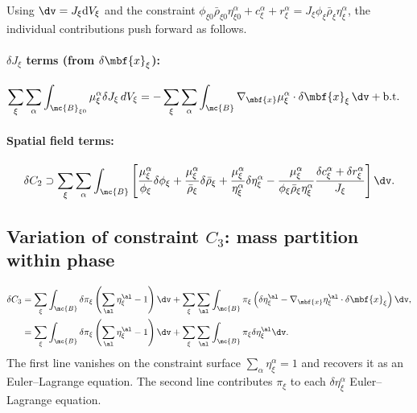 Using $\dv = J_\xi {\rm d}V_\xi$ and the constraint $\phi_{\xi0}\bar\rho_{\xi0}\eta_{\xi0}^\alpha+c_\xi^\alpha+r_\xi^\alpha=J_\xi\phi_\xi\bar\rho_\xi\eta_\xi^\alpha$, the individual contributions push forward as follows.

\paragraph{$\delta J_\xi$ terms (from $\delta\mbf{x}_\xi$):}
\begin{align}
  \sum_\xi\sum_\alpha \int_{\mc{B}_{\xi0}}
    \mu_\xi^\alpha \delta J_\xi \, dV_\xi
  &= -\sum_\xi\sum_\alpha \int_{\mc{B}}
    \nabla_{\mbf{x}}\mu_\xi^\alpha \cdot \delta\mbf{x}_\xi \, \dv
    + \text{b.t.}
  \label{eq:C2_dJ}
\end{align}

\paragraph{Spatial field terms:}
\begin{align}
  \delta C_2 \supset \sum_\xi\sum_\alpha\int_{\mc{B}}
  \left[
    \frac{\mu_\xi^\alpha}{\phi_\xi}\delta\phi_\xi
    + \frac{\mu_\xi^\alpha}{\bar\rho_\xi}\delta\bar\rho_\xi
    + \frac{\mu_\xi^\alpha}{\eta_\xi^\alpha}\delta\eta_\xi^\alpha
    - \frac{\mu_\xi^\alpha}{\phi_\xi\bar\rho_\xi\eta_\xi^\alpha}\frac{\delta c_\xi^\alpha+\delta r_\xi^\alpha}{J_\xi}
  \right]\dv .
  \label{eq:C2_spatial_push}
\end{align}
\subsection{Variation of constraint $C_3$: mass partition within phase}
\label{sec:var_C3_app}

\begin{align}
  \delta C_3
  &= \sum_\xi \int_{\mc{B}} \delta\pi_\xi \left(\sum_\al \eta_\xi^\al - 1\right) \dv
  + \sum_\xi \sum_\al \int_{\mc{B}} \pi_\xi \left(\delta\eta^\al_\xi - \nabla_{\mbf{x}}\eta_\xi^\al\cdot\delta\mbf{x}_\xi\right) \dv, \notag \\
  &= \sum_\xi \int_{\mc{B}} \delta\pi_\xi \left(\sum_\al \eta_\xi^\al - 1\right) \dv
  + \sum_\xi \sum_\al \int_{\mc{B}} \pi_\xi \delta\eta^\al_\xi \dv.
  \label{eq:deltaC3_app}
\end{align}
%
The first line vanishes on the constraint surface $\sum_\alpha\eta_\xi^\alpha = 1$ and recovers it as an Euler--Lagrange equation.  The second line contributes $\pi_\xi$ to each $\delta\eta_\xi^\alpha$ Euler--Lagrange equation.

